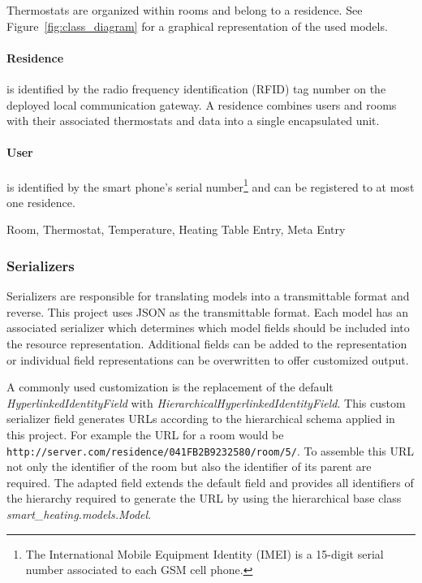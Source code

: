 Thermostats are organized within rooms and belong to a residence. See Figure~\ref{fig:class_diagram} for a graphical representation of the used models.

\paragraph{Residence}

is identified by the radio frequency identification (RFID) tag number on the deployed local communication gateway. A residence combines users and rooms with their associated thermostats and data into a single encapsulated unit.

\paragraph{User}

is identified by the smart phone's serial number\footnote{The International Mobile Equipment Identity (IMEI) is a 15-digit serial number associated to each GSM cell phone.} and can be registered to at most one residence.

Room, Thermostat, Temperature, Heating Table Entry, Meta Entry


\subsubsection{Serializers}
\label{sec:server_infrastructure_serializers}

Serializers are responsible for translating models into a transmittable format and reverse.
This project uses JSON as the transmittable format.
Each model has an associated serializer which determines which model fields should be included into the resource representation.
Additional fields can be added to the representation or individual field representations can be overwritten to offer customized output.

A commonly used customization is the replacement of the default \emph{HyperlinkedIdentityField} with \emph{HierarchicalHyperlinkedIdentityField}.
This custom serializer field generates URLs according to the hierarchical schema applied in this project.
For example the URL for a room would be \nolinkurl{http://server.com/residence/041FB2B9232580/room/5/}.
To assemble this URL not only the identifier of the room but also the identifier of its parent are required.
The adapted field extends the default field and provides all identifiers of the hierarchy required to generate the URL by using the hierarchical base class \emph{smart\_heating.models.Model}.

